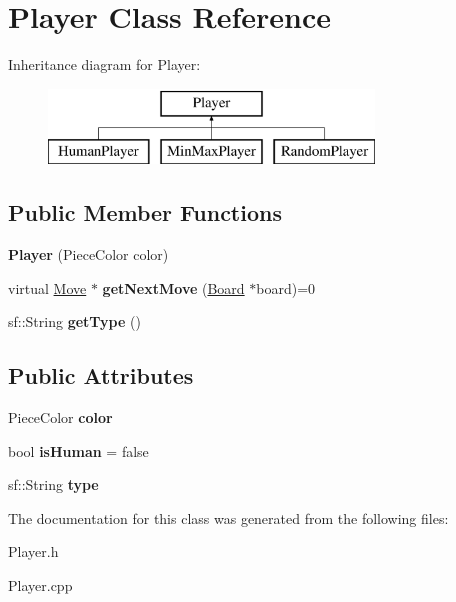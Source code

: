 \hypertarget{class_player}{}\section{Player Class Reference}
\label{class_player}
Inheritance diagram for Player\+:\begin{figure}[H]
\begin{center}
\leavevmode
\includegraphics[height=2.000000cm]{class_player}
\end{center}
\end{figure}
\subsection*{Public Member Functions}
\begin{DoxyCompactItemize}
\item 
\mbox{\label{class_player_ab89c7040e9d3c84a557992039ee10418}} 
{\bfseries Player} (Piece\+Color color)
\item 
\mbox{\label{class_player_a8db77e6dbadc43eb46082f2c6a968263}} 
virtual \mbox{\hyperlink{class_move}{Move}} $\ast$ {\bfseries get\+Next\+Move} (\mbox{\hyperlink{class_board}{Board}} $\ast$board)=0
\item 
\mbox{\label{class_player_adf2d92f983787d56e76037dc07405f4a}} 
sf\+::\+String {\bfseries get\+Type} ()
\end{DoxyCompactItemize}
\subsection*{Public Attributes}
\begin{DoxyCompactItemize}
\item 
\mbox{\label{class_player_a40181d4e968d85d198205655e0792da3}} 
Piece\+Color {\bfseries color}
\item 
\mbox{\label{class_player_a7ad52d0cef77e6b9d1329c07c9467874}} 
bool {\bfseries is\+Human} = false
\item 
\mbox{\label{class_player_a24f7383acd66d89e372fb1e2f0f3d504}} 
sf\+::\+String {\bfseries type}
\end{DoxyCompactItemize}


The documentation for this class was generated from the following files\+:\begin{DoxyCompactItemize}
\item 
Player.\+h\item 
Player.\+cpp\end{DoxyCompactItemize}
